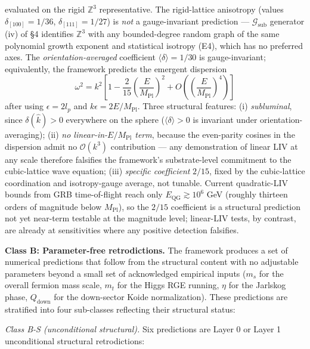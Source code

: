 \documentclass[
]{article}
\begin{document}
\begin{itemize}
  evaluated on the rigid \(\mathbb{Z}^3\) representative. The
  rigid-lattice anisotropy (values \(\delta_{[100]} = 1/36\),
  \(\delta_{[111]} = 1/27\)) is \emph{not} a gauge-invariant prediction
  --- \(\mathcal{G}_{\text{sub}}\) generator (iv) of §4 identifies
  \(\mathbb{Z}^3\) with any bounded-degree random graph of the same
  polynomial growth exponent and statistical isotropy (E4), which has no
  preferred axes. The \emph{orientation-averaged} coefficient
  \(\langle\delta\rangle = 1/30\) is gauge-invariant; equivalently, the
  framework predicts the emergent dispersion
  \[\omega^2 = k^2\left[1 - \frac{2}{15}\left(\frac{E}{M_{\text{Pl}}}\right)^2 + O\left(\left(\frac{E}{M_{\text{Pl}}}\right)^4\right)\right]\]
  after using \(\epsilon = 2 l_p\) and
  \(k\epsilon = 2 E/M_{\text{Pl}}\). Three structural features: (i)
  \emph{subluminal}, since \(\delta(\hat k) > 0\) everywhere on the
  sphere (\(\langle\delta\rangle > 0\) is invariant under
  orientation-averaging); (ii) \emph{no linear-in-\(E/M_{\text{Pl}}\)
  term}, because the even-parity cosines in the dispersion admit no
  \(\mathcal{O}(k^3)\) contribution --- any demonstration of linear LIV
  at any scale therefore falsifies the framework's substrate-level
  commitment to the cubic-lattice wave equation; (iii) \emph{specific
  coefficient} \(2/15\), fixed by the cubic-lattice coordination and
  isotropy-gauge average, not tunable. Current quadratic-LIV bounds from
  GRB time-of-flight reach only \(E_{\text{QG}} \gtrsim 10^6\) GeV
  (roughly thirteen orders of magnitude below \(M_{\text{Pl}}\)), so the
  \(2/15\) coefficient is a structural prediction not yet near-term
  testable at the magnitude level; linear-LIV tests, by contrast, are
  already at sensitivities where any positive detection falsifies.
\end{itemize}

\textbf{Class B: Parameter-free retrodictions.} The framework produces a
set of numerical predictions that follow from the structural content
with no adjustable parameters beyond a small set of acknowledged
empirical inputs (\(m_s\) for the overall fermion mass scale, \(m_t\)
for the Higgs RGE running, \(\eta\) for the Jarlskog phase,
\(Q_{\text{down}}\) for the down-sector Koide normalization). These
predictions are stratified into four sub-classes reflecting their
structural status:

\emph{Class B-S (unconditional structural).} Six predictions are Layer 0
or Layer 1 unconditional structural retrodictions:
\end{document}
